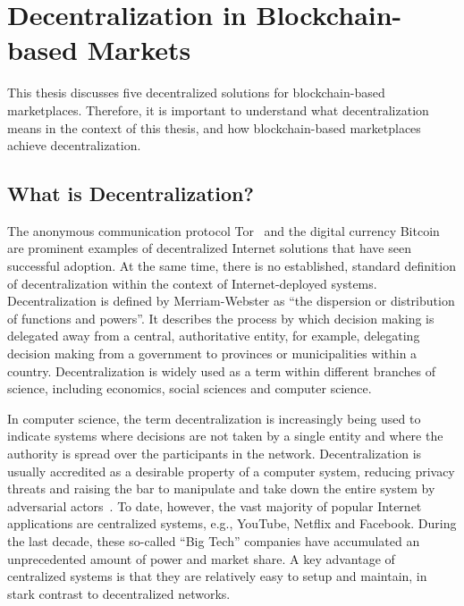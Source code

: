 \section{Decentralization in Blockchain-based Markets}
\label{sec:decentralization}
This thesis discusses five decentralized solutions for blockchain-based marketplaces.
Therefore, it is important to understand what decentralization means in the context of this thesis, and how blockchain-based marketplaces achieve decentralization.

\subsection{What is Decentralization?}
The anonymous communication protocol Tor~\cite{syverson2004tor} and the digital currency Bitcoin~\cite{nakamoto2008bitcoin} are prominent examples of decentralized Internet solutions that have seen successful adoption.
At the same time, there is no established, standard definition of decentralization within the context of Internet-deployed systems.
Decentralization is defined by Merriam-Webster as \enquote{the dispersion or distribution of functions and powers}.
It describes the process by which decision making is delegated away from a central, authoritative entity, for example, delegating decision making from a government to provinces or municipalities within a country.
Decentralization is widely used as a term within different branches of science, including economics, social sciences and computer science.

In computer science, the term decentralization is increasingly being used to indicate systems where decisions are not taken by a single entity and where the authority is spread over the participants in the network.
Decentralization is usually accredited as a desirable property of a computer system, reducing privacy threats and raising the bar to manipulate and take down the entire system by adversarial actors~\cite{troncoso2017systematizing}.
To date, however, the vast majority of popular Internet applications are centralized systems, e.g., YouTube, Netflix and Facebook.
During the last decade, these so-called \enquote{Big Tech} companies have accumulated an unprecedented amount of power and market share.
A key advantage of centralized systems is that they are relatively easy to setup and maintain, in stark contrast to decentralized networks.

